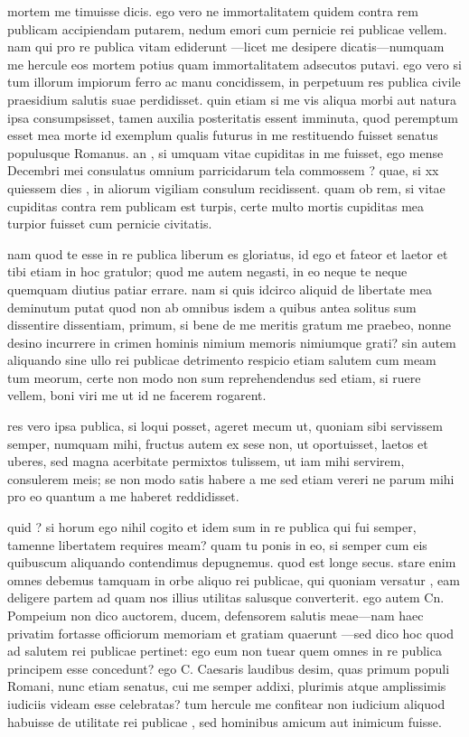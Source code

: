  mortem me timuisse dicis. ego vero ne immortalitatem quidem contra rem publicam accipiendam putarem, nedum emori cum pernicie rei publicae vellem. nam qui pro re publica vitam ediderunt —licet me desipere dicatis—numquam me hercule eos mortem potius quam immortalitatem adsecutos putavi. ego vero si tum illorum impiorum ferro ac manu concidissem, in perpetuum res publica civile praesidium salutis suae perdidisset. quin etiam si me vis aliqua morbi aut natura ipsa consumpsisset, tamen auxilia posteritatis essent imminuta, quod peremptum esset mea morte id exemplum qualis futurus in me restituendo fuisset senatus populusque Romanus. an , si umquam vitae cupiditas in me fuisset, ego mense Decembri mei consulatus omnium parricidarum tela commossem ? quae, si xx quiessem dies , in aliorum vigiliam consulum recidissent. quam ob rem, si vitae cupiditas contra rem publicam est turpis, certe multo mortis cupiditas mea turpior fuisset cum pernicie civitatis.

 nam quod te esse in re publica liberum es gloriatus, id ego et fateor et laetor et tibi etiam in hoc gratulor; quod me autem negasti, in eo neque te neque quemquam diutius patiar errare. nam si quis idcirco aliquid de libertate mea deminutum putat quod non ab omnibus isdem a quibus antea solitus sum dissentire dissentiam, primum, si bene de me meritis gratum me praebeo, nonne desino incurrere in crimen hominis nimium memoris nimiumque grati? sin autem aliquando sine ullo rei publicae detrimento respicio etiam salutem cum meam tum meorum, certe non modo non sum reprehendendus sed etiam, si ruere vellem, boni viri me ut id ne facerem rogarent.

 res vero ipsa publica, si loqui posset, ageret mecum ut, quoniam sibi servissem semper, numquam mihi, fructus autem ex sese non, ut oportuisset, laetos et uberes, sed magna acerbitate permixtos tulissem, ut iam mihi servirem, consulerem meis; se non modo satis habere a me sed etiam vereri ne parum mihi pro eo quantum a me haberet reddidisset.

 quid ? si horum ego nihil cogito et idem sum in re publica qui fui semper, tamenne libertatem requires meam? quam tu ponis in eo, si semper cum eis quibuscum aliquando contendimus depugnemus. quod est longe secus. stare enim omnes debemus tamquam in orbe aliquo rei publicae, qui quoniam versatur , eam deligere partem ad quam nos illius utilitas salusque converterit. ego autem Cn. Pompeium non dico auctorem, ducem, defensorem salutis meae—nam haec privatim fortasse officiorum memoriam et gratiam quaerunt —sed dico hoc quod ad salutem rei publicae pertinet: ego eum non tuear quem omnes in re publica principem esse concedunt? ego C. Caesaris laudibus desim, quas primum populi Romani, nunc etiam senatus, cui me semper addixi, plurimis atque amplissimis iudiciis videam esse celebratas? tum hercule me confitear non iudicium aliquod habuisse de utilitate rei publicae , sed hominibus amicum aut inimicum fuisse.

